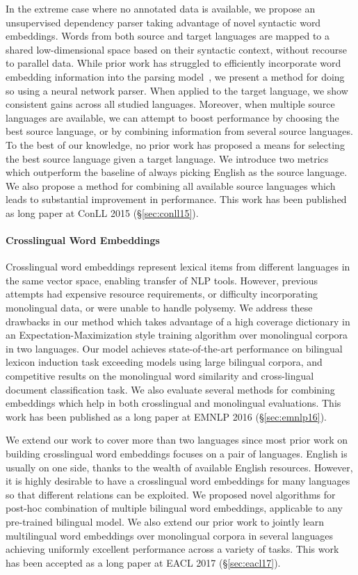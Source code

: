 \documentclass[12pt,twoside,final,hidelinks]{ltthesis}
\theoremstyle{definition}
\newcommand\conllv{ConLL 2015 (\S\ref{sec:conll15})}
\newcommand\emnlpvi{EMNLP 2016 (\S\ref{sec:emnlp16})}
\newcommand\eaclvii{EACL 2017 (\S\ref{sec:eacl17})}
\begin{document}
In the extreme case where no annotated data is available, we propose an unsupervised dependency parser taking advantage of novel 
syntactic word embeddings. Words from both source and target languages are mapped to a shared low-dimensional
space based on their syntactic context, without recourse to parallel data.
While prior work has struggled to efficiently incorporate word embedding information into the parsing model~\cite{mohit:ACL14,andreas-klein:2014:P14-2,chen-zhang-zhang:2014:Coling},
we present a method for doing so using a neural network parser. When applied to the target language, we show consistent gains across all studied languages.
Moreover, when multiple source languages are available, we can attempt to boost
performance by choosing the best source language, or by combining
information from several source languages. To the best
of our knowledge, no prior work has proposed a means for selecting the
best source language given a target language. We
introduce two metrics which outperform the baseline of always picking
English as the source language. We also propose a method for combining
all available source languages which leads to substantial improvement in performance.
This work has been published as long paper at \conllv. 

\paragraph{Crosslingual Word Embeddings}
Crosslingual word embeddings represent lexical items from different languages in the same vector space, enabling transfer of NLP tools. 
However, previous attempts had %
expensive resource requirements, or difficulty incorporating monolingual data, or were unable to handle polysemy.
We address these drawbacks in our method which takes advantage of a high coverage dictionary in an Expectation-Maximization style training algorithm over monolingual corpora in two languages. Our model achieves state-of-the-art performance on bilingual lexicon induction task exceeding models using large bilingual corpora, and
competitive results on the monolingual word similarity and cross-lingual document classification task. We also evaluate several methods for combining embeddings which help in both crosslingual and monolingual evaluations. This work has been published as a long paper at \emnlpvi. 

We extend our work to cover more than two languages since most prior work on building crosslingual word embeddings focuses on a pair of languages.
English is usually on one side, thanks to the wealth of available English resources.
However, it is highly desirable to have a crosslingual word embeddings for many languages so that different relations can be exploited. We proposed novel algorithms for post-hoc combination of multiple bilingual word embeddings, applicable to any pre-trained bilingual model. We also extend our prior work to jointly learn multilingual word embeddings over monolingual corpora in several languages achieving uniformly excellent performance across a variety of tasks. This work has been accepted as a long paper at \eaclvii.
\end{document}
